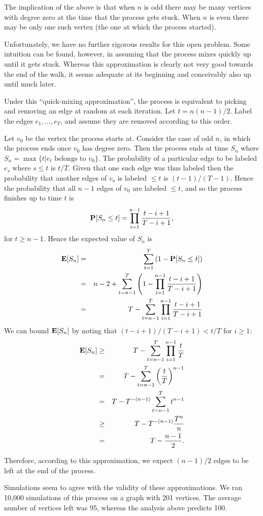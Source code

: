 \documentclass[11pt]{article} \usepackage{amssymb}
\newcommand{\E}{{\bf E}} \newcommand{\Cov}{{\bf Cov}}
\begin{document}
\begin{enumerate}
  The implication of the above is that when $n$ is odd there may be many
  vertices with degree zero at the time that the process gets stuck. When $n$
  is even there may be only one such vertex (the one at which the process
  started).
  
  Unfortunately, we have no further rigorous results for this open problem. 
  Some 
  intuition can be found, however, in assuming that the process mixes quickly
  up until it gets stuck. Whereas this approximation is clearly not very good
  towards the end of the walk, it seems adequate at its beginning and 
  conceivably also up until much later. 

  Under this ``quick-mixing approximation'', 
  the process is equivalent to picking and removing an edge at random at
  each iteration. Let $t=n(n-1)/2$. Label the edges $e_1,\ldots,e_T$, 
  and assume they are removed according to this order. 

  Let $v_0$ be the vertex the process starts at. Consider the case of odd $n$, 
  in which the process ends once $v_0$ has degree zero. Then the process ends
  at time $S_n$ where $S_n=\max\{t|e_t\mbox{ belongs to } v_0\}$. The probability of a particular
  edge to be labeled $e_s$ where $s\leq t$ is $t/T$. Given that one such edge was thus
  labeled then the probability that another edges of $v_o$ is labeled $\leq t$
  is $(t-1)/(T-1)$. Hence the probability
  that all $n-1$ edges of $v_0$ are labeled $\leq t$, and so the process finishes
  up to time $t$ is 
  \begin{equation*}
    \P[S_n\leq t] = \prod_{i=1}^{n-1}{t-i+1\over T-i + 1},
  \end{equation*}
  for $t\geq n-1$. Hence the expected value of $S_n$ is
  \begin{eqnarray*}
    \E[S_n]&=& \sum_{t=1}^T\left(1-\P[S_n\leq t]\right)
    \\ &=&n-2+\sum_{t=n-1}^T\left(1-\prod_{i=1}^{n-1}{t-i+1\over T-i + 1}\right)
    \\ &=& T - \sum_{t=n-1}^T\prod_{i=1}^{n-1}{t-i+1\over T-i + 1}
  \end{eqnarray*}
  We can bound $\E[S_n]$ by noting that $(t-i+1)/(T-i+1)<t/T$ for $i\geq 1$:
  \begin{eqnarray*}
    \E[S_n] &\geq&T - \sum_{t=n-1}^T\prod_{i=1}^{n-1}{t\over T}
    \\ &=& T - \sum_{t=n-1}^T\left({t\over T}\right)^{n-1}
    \\ &=& T - T^{-(n-1)}\sum_{t=n-1}^Tt^{n-1}
    \\ &\geq& T - T^{-(n-1)}{T^n \over n}
    \\ &=& T-{n-1\over 2}.
  \end{eqnarray*}
  
  Therefore, according to this approximation, we expect $(n-1)/2$ edges to be 
  left at the end of the process. 
 
  Simulations seem to agree with the validity of these approximations. We ran
  10,000 simulations of this process on a graph with 201 vertices. The average
  number of vertices left was 95, whereas the analysis above predicts 100.

\end{enumerate}
\end{document}
